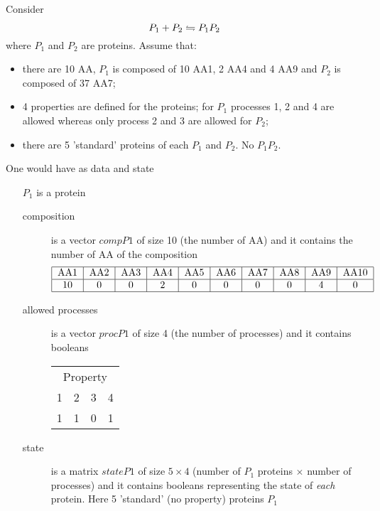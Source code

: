 \medskip

Consider
$$
  P_1+P_2 \stackrel{}{\leftrightharpoons} P_1P_2
$$
where $P_1$ and $P_2$ are proteins. Assume that:
\begin{itemize}
  \item there are 10 AA, $P_1$ is composed of 10 AA1, 2 AA4 and 4 AA9 and $P_2$ is composed of 37 AA7;
  \item 4 properties are defined for the proteins; for $P_1$ processes 1, 2 and 4 are allowed whereas only process 2 and 3 are allowed for $P_2$;
  \item there are 5 'standard' proteins of each $P_1$ and $P_2$. No $P_1P_2$.
\end{itemize}
One would have as data and state
\begin{enumerate}
  \item[$P_1$] is a protein
  \begin{description}
    \item[composition] is a vector $compP1$ of size 10 (the number of AA) and it contains the number of AA of the composition
    $$
      \begin{tabular}{|c|c|c|c|c|c|c|c|c|c|}
        \hline
        AA1 & AA2 & AA3 & AA4 & AA5 & AA6 & AA7 & AA8 & AA9 & AA10 \\ \hline
        10 & 0 & 0 & 2 & 0 & 0 & 0 & 0 & 4 & 0 \\
        \hline
      \end{tabular}
    $$
    \item[allowed processes] is a vector $procP1$ of size 4 (the number of processes) and it contains booleans
    \begin{tabular}{|c|c|c|c|}
      \hline
      \multicolumn{4}{|c|}{Property} \\
      1 & 2 & 3 & 4 \\ \hline
      1 & 1 & 0 & 1 \\
      \hline
    \end{tabular}
    \item[state] is a matrix $stateP1$ of size $5\times 4$ (number of $P_1$ proteins $\times$ number of processes) and it contains booleans representing the state of {\em each} protein. Here 5 'standard' (no property) proteins $P_1$
    \begin{tabular}{|c|c|c|c|c|}
      \hline

\end{tabular}
\end{description}
\end{enumerate}
